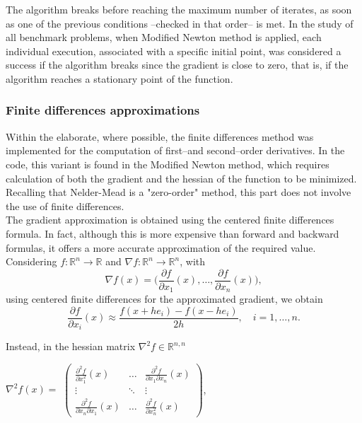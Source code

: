 \documentclass[a4paper,12pt]{article}
\begin{document}
	\noindent The algorithm breaks before reaching the maximum number of iterates, as soon as one of the previous conditions --checked in that order-- is met. In the study of all benchmark problems, when Modified Newton method is applied, each individual execution, associated with a specific initial point, was considered a success if the algorithm breaks since the gradient is close to zero, that is, if the algorithm reaches a stationary point of the function.  
	
	\subsubsection{Finite differences approximations}
	Within the elaborate, where possible, the finite differences method was implemented for the computation of first--and second--order derivatives. In the code, this variant is found in the Modified Newton method, which requires calculation of both the gradient and the hessian of the function to be minimized. Recalling that Nelder-Mead is a "zero-order" method, this part does not involve the use of finite differences. \\
	
	The gradient approximation is obtained using the centered finite differences formula. In fact, although this is more expensive than forward and backward formulas, it offers a more accurate approximation of the required value. Considering $f: \mathbb{R}^{n} \xrightarrow{}\mathbb{R}$ and $\nabla f: \mathbb{R}^{n} \xrightarrow{}\mathbb{R}^{n}$, with 
	\[
	\nabla f(x) =  \bigg( \frac{\partial f}{\partial x_{1}}(x),\dots,\frac{\partial f}{\partial 
		x_{n}}(x)\bigg),
	\]
	using centered finite differences for the approximated gradient, we obtain
	\begin{equation}\label{eq1}
		\frac{\partial f}{\partial x_{i}}(x) \approx \frac{f(x+he_{i}) - f(x-he_{i})}{2h}, \quad i = 1,\dots,n.	
	\end{equation}
	
	Instead, in the hessian matrix $\nabla^{2}f \in \mathbb{R}^{n,n}$\\
	
	\begin{center}
		$\nabla^{2}f(x) =$
		$\begin{pmatrix}
			
			\frac{\partial^{2}f}{\partial x_{1}^{2}}(x) & \dots & \frac{\partial^{2} f}{\partial x_{1}\partial x_{n}}(x)\\
			\vdots & \ddots &\vdots \\
			\frac{\partial^{2} f}{\partial x_{n}\partial x_{1}}(x) & \dots & \frac{\partial^{2}f}{\partial x_{n}^{2}}(x)
		\end{pmatrix}$, \\
	\end{center}
	
\end{document}
